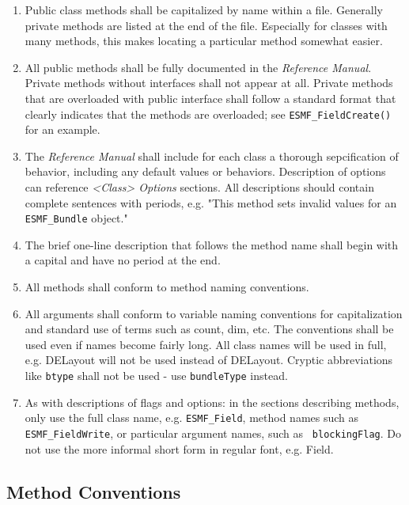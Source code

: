 \begin{enumerate}
\item Public class methods shall be capitalized by name within a file.
Generally private methods are listed at the end of the file.  Especially 
for classes with many methods, this makes locating a particular method 
somewhat easier.

\item All public methods shall be fully documented in the {\it Reference
Manual}.  Private methods without interfaces shall not appear at all.
Private methods that are overloaded with public interface shall follow
a standard format that clearly indicates that the methods are overloaded;
see {\tt ESMF\_FieldCreate()} for an example.

\item The {\it Reference Manual} shall include for each class a thorough
sepcification of behavior, including any default values or behaviors.
Description of options can reference {\it <Class> Options} sections.
All descriptions should contain complete sentences with periods,
e.g. "This method sets invalid values for an {\tt ESMF\_Bundle} object."

\item The brief one-line description that follows the method name shall
begin with a capital and have no period at the end.

\item All methods shall conform to method naming conventions.

\item All arguments shall conform to variable naming conventions
for capitalization and standard use of terms such as count, dim, etc.
The conventions shall be used even if names become fairly long.
All class names will be used in full, e.g. DELayout will not be
used instead of DELayout.  Cryptic abbreviations like {\tt btype} 
shall not be used - use {\tt bundleType} instead.

\item As with descriptions of flags and options:  in the sections describing
methods, only use the full class name, e.g. {\tt ESMF\_Field}, method names such
as {\tt ESMF\_FieldWrite}, or particular argument names, such as {\tt
blockingFlag}. Do not use the more informal short form in regular 
font, e.g. Field.

\end{enumerate}


\subsection{Method Conventions}

